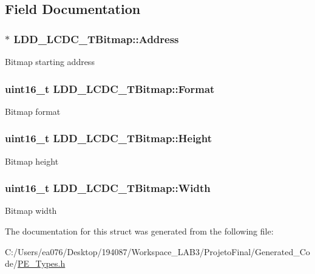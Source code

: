 \subsection{Field Documentation}
\hypertarget{struct_l_d_d___l_c_d_c___t_bitmap_a5501acee73fa929201a06eccc4821a7a}{
\subsubsection[{Address}]{$\ast$ L\-D\-D\-\_\-\-L\-C\-D\-C\-\_\-\-T\-Bitmap\-::\-Address}}\label{struct_l_d_d___l_c_d_c___t_bitmap_a5501acee73fa929201a06eccc4821a7a}
Bitmap starting address \hypertarget{struct_l_d_d___l_c_d_c___t_bitmap_a8f886a6ce6e67d4b070c20bdd5ce495a}{
\subsubsection[{Format}]{\setlength{\rightskip}{0pt plus 5cm}uint16\-\_\-t L\-D\-D\-\_\-\-L\-C\-D\-C\-\_\-\-T\-Bitmap\-::\-Format}}\label{struct_l_d_d___l_c_d_c___t_bitmap_a8f886a6ce6e67d4b070c20bdd5ce495a}
Bitmap format \hypertarget{struct_l_d_d___l_c_d_c___t_bitmap_a13fea31674709c4f681e6c86d3b71206}{
\subsubsection[{Height}]{\setlength{\rightskip}{0pt plus 5cm}uint16\-\_\-t L\-D\-D\-\_\-\-L\-C\-D\-C\-\_\-\-T\-Bitmap\-::\-Height}}\label{struct_l_d_d___l_c_d_c___t_bitmap_a13fea31674709c4f681e6c86d3b71206}
Bitmap height \hypertarget{struct_l_d_d___l_c_d_c___t_bitmap_af88017bd29e49292265c1fda6dc5463d}{
\subsubsection[{Width}]{\setlength{\rightskip}{0pt plus 5cm}uint16\-\_\-t L\-D\-D\-\_\-\-L\-C\-D\-C\-\_\-\-T\-Bitmap\-::\-Width}}\label{struct_l_d_d___l_c_d_c___t_bitmap_af88017bd29e49292265c1fda6dc5463d}
Bitmap width 

The documentation for this struct was generated from the following file\-:\begin{DoxyCompactItemize}
\item 
C\-:/\-Users/ea076/\-Desktop/194087/\-Workspace\-\_\-\-L\-A\-B3/\-Projeto\-Final/\-Generated\-\_\-\-Code/\hyperlink{_p_e___types_8h}{P\-E\-\_\-\-Types.\-h}\end{DoxyCompactItemize}
